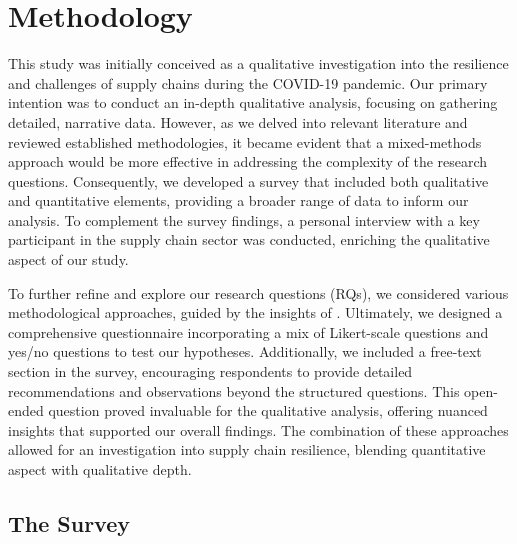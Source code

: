 \chapter{Methodology}

This study was initially conceived as a qualitative investigation into the resilience and challenges of supply chains during the COVID-19 pandemic. Our primary intention was to conduct an in-depth qualitative analysis, focusing on gathering detailed, narrative data. However, as we delved into relevant literature and reviewed established methodologies, it became evident that a mixed-methods approach would be more effective in addressing the complexity of the research questions. Consequently, we developed a survey that included both qualitative and quantitative elements, providing a broader range of data to inform our analysis. To complement the survey findings, a personal interview with a key participant in the supply chain sector was conducted, enriching the qualitative aspect of our study.

To further refine and explore our research questions (RQs), we considered various methodological approaches, guided by the insights of \textcite{Ghauri2020ResearchStudies}. Ultimately, we designed a comprehensive questionnaire incorporating a mix of Likert-scale questions \parencite{Joshi2015LikertExplained,Batterton2017MilitaryIt,Mirahmadizadeh2018DesigningData} and yes/no questions to test our hypotheses. Additionally, we included a free-text section in the survey, encouraging respondents to provide detailed recommendations and observations beyond the structured questions. This open-ended question proved invaluable for the qualitative analysis, offering nuanced insights that supported our overall findings. The combination of these approaches allowed for an investigation into supply chain resilience, blending quantitative aspect with qualitative depth.

\section{The Survey}

